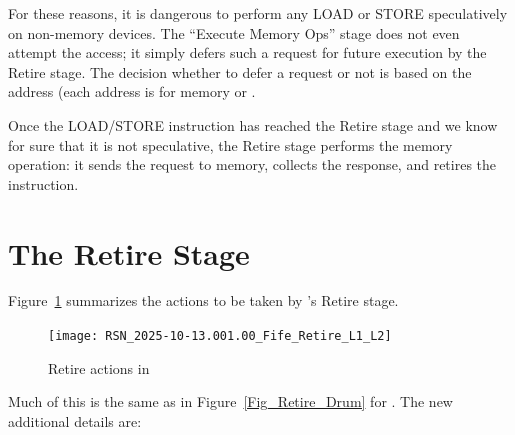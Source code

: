 For these reasons, it is dangerous to perform any LOAD or STORE
speculatively on non-memory devices.  The ``Execute Memory Ops'' stage
does not even attempt the access; it simply defers such a request for
future execution by the Retire stage.  The decision whether to defer a
request or not is based on the address (each address is for memory or .

Once the LOAD/STORE instruction has reached the Retire stage and we
know for sure that it is not speculative, the Retire stage performs
the memory operation: it sends the request to memory, collects the
response, and retires the instruction.





\section{The Retire Stage}

\label{Sec_Fife_Retire_Principles}

Figure~\ref{Fig_Fife_Retire} summarizes the actions to be taken by
{\FIFE}'s Retire stage.

\begin{figure}[htbp]
  \centerline{\texttt{[image: RSN\_2025-10-13.001.00\_Fife\_Retire\_L1\_L2]}}
  \caption{\label{Fig_Fife_Retire}Retire actions in {\FIFE}}
\end{figure}

Much of this is the same as in Figure~\ref{Fig_Retire_Drum} for {\DRUM}.
The new additional details are:

